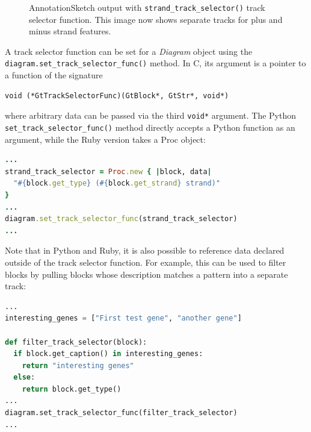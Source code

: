 \documentclass[a4paper]{scrreprt}
\begin{document}
\begin{figure}[ht]
\caption{AnnotationSketch output with \texttt{strand\_track\_se\-lector()} track selector function. This image now shows separate tracks for plus and minus strand features.}
\label{tsexample2}
\end{figure}

A track selector function can be set for a \emph{Diagram} object using the \texttt{diagram.set\_track\_se\-lec\-tor\_func()} method. In C, its argument is a pointer to a function of the signature
\medskip
\begin{verbatim}
void (*GtTrackSelectorFunc)(GtBlock*, GtStr*, void*)
\end{verbatim}
\medskip
where arbitrary data can be passed via the third \texttt{void*} argument. The Python \texttt{set\_track\_se\-lec\-tor\_func()} method directly accepts a Python function as an argument, while the Ruby version takes a Proc object:

\begin{lstlisting}[language=Ruby, showstringspaces=false,numbers=none,frame=single]
...
strand_track_selector = Proc.new { |block, data|
  "#{block.get_type} (#{block.get_strand} strand)"
}
...
diagram.set_track_selector_func(strand_track_selector)
...
\end{lstlisting}

Note that in Python and Ruby, it is also possible to reference data declared outside of the track selector function. For example, this can be used to filter blocks by pulling blocks whose description matches a pattern into a separate track:

\begin{lstlisting}[language=Python, showstringspaces=false,numbers=none,frame=single]
...
interesting_genes = ["First test gene", "another gene"]

def filter_track_selector(block):
  if block.get_caption() in interesting_genes:
    return "interesting genes"
  else:
    return block.get_type()
...
diagram.set_track_selector_func(filter_track_selector)
...
\end{lstlisting}
\end{document}
